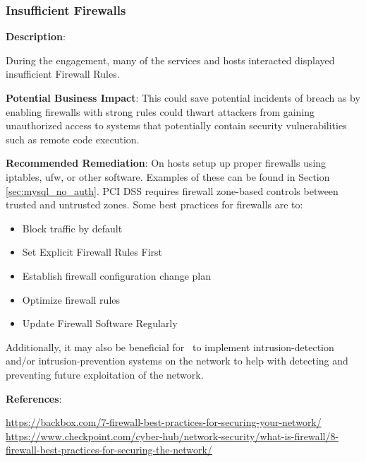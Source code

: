 \subsubsection{Insufficient Firewalls}
\label{sec:insufficient-firewalls}
\noindent


\color{black}{}
\textbf{Description}:

During the engagement, many of the services and hosts interacted displayed insufficient Firewall Rules. 

\noindent
\textbf{Potential Business Impact}:
This could save potential incidents of breach as by enabling firewalls with strong rules could thwart attackers from gaining unauthorized access to systems that potentially contain security vulnerabilities such as remote code execution.

\noindent
\textbf{Recommended Remediation}:
On hosts setup up proper firewalls using iptables, ufw, or other software. Examples of these can be found in Section \ref{sec:mysql_no_auth}. PCI DSS requires firewall zone-based controls between trusted and untrusted zones. Some best practices for firewalls are to:

\begin{itemize}
    \item Block traffic by default
    \item Set Explicit Firewall Rules First 
    \item Establish firewall configuration change plan 
    \item Optimize firewall rules
    \item Update Firewall Software Regularly
\end{itemize}

Additionally, it may also be beneficial for \cptc\ to implement intrusion-detection and/or intrusion-prevention systems on the network to help with detecting and preventing future exploitation of the network.

\noindent
\textbf{References}:

\url{https://backbox.com/7-firewall-best-practices-for-securing-your-network/}
\url{https://www.checkpoint.com/cyber-hub/network-security/what-is-firewall/8-firewall-best-practices-for-securing-the-network/}

